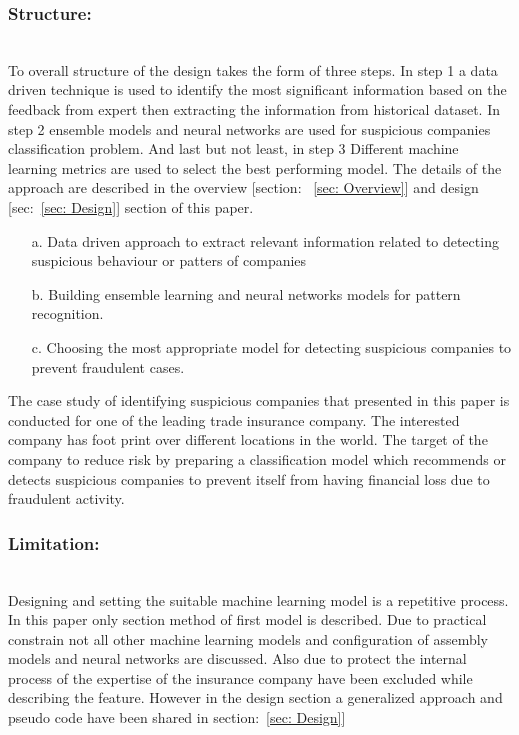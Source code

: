 \subsubsection{Structure:}\hspace*{\fill} \\
To overall structure of the design takes the form of three steps. In step 1 a data driven technique is used to identify the most significant information based on the feedback from expert then extracting the information from historical dataset. In step 2 ensemble models and neural networks are used for suspicious companies classification problem. And last but not least, in step 3 Different machine learning metrics are used to select the best performing model. The details of the approach are described in the overview [section: ~\ref{sec: Overview}] and design [sec:~\ref{sec: Design}] section of this paper.

\begin{itemize}
    \item[a.] Data driven approach to extract relevant information related to detecting suspicious behaviour or patters of companies
    \item[b.] Building ensemble learning and neural networks models for pattern recognition. 
    \item[c.] Choosing the most appropriate model for detecting suspicious companies to prevent fraudulent cases.
\end{itemize}




The case study of identifying suspicious companies that presented in this paper is conducted for one of the leading trade insurance company. The interested company has foot print over different locations in the world. The target of the company to reduce risk by preparing a classification model which recommends or detects suspicious companies to prevent itself from having financial loss due to fraudulent activity.

\subsubsection{Limitation:}\hspace*{\fill} \\
Designing and setting the suitable machine learning model is a repetitive process. In this paper only section method of first model is described. Due to practical constrain not all other machine learning models and configuration of assembly models and neural networks are discussed. Also due to protect the internal process of the expertise of the insurance company have been excluded while describing the feature. However in the design section a generalized approach and pseudo code have been shared in section:~\ref{sec: Design}]






